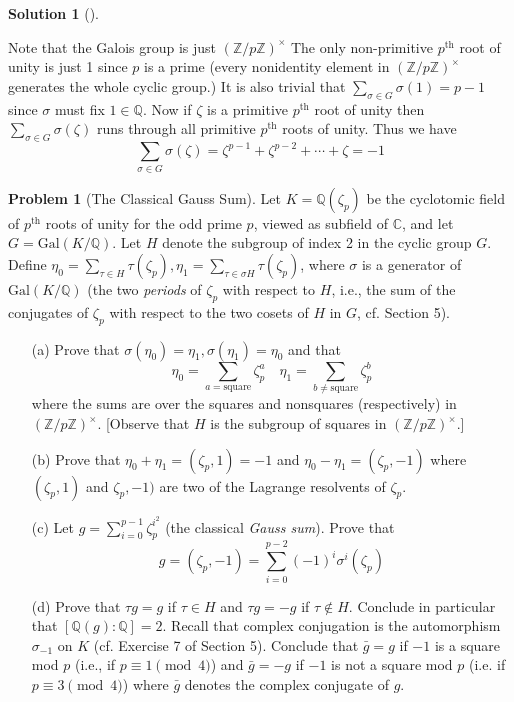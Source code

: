 \documentclass{article}
\theoremstyle{definition}
\newtheorem{prob}{Problem}
\newtheorem*{sol}{Solution}
\newenvironment{sols}[1][]{%
  \begin{sol}[#1]$ $\par\nobreak\ignorespaces
}{%
  \end{sol}
}
\newcommand{\CC}{\mathbb C}
\newcommand{\QQ}{\mathbb Q}
\newcommand{\ZZ}{\mathbb Z}
\newcommand{\Gal}{\text{Gal}}
\begin{document}
\begin{sols}
	Note that the Galois group is just $(\ZZ/p \ZZ)^\times$
	The only non-primitive $p^{\text{th}}$ root of unity is just 1 since $p$ is a prime (every nonidentity element in $(\ZZ/p \ZZ)^\times$ generates the whole cyclic group.)
	It is also trivial that $\sum_{\sigma \in G} \sigma(1) = p - 1$ since $\sigma$ must fix $1 \in \QQ$.
	Now if $\zeta$ is a primitive $p^{\text{th}}$ root of unity then $\sum_{\sigma \in G} \sigma(\zeta)$ runs through all primitive $p^{\text{th}}$ roots of unity.
	Thus we have
	\[
		\sum_{\sigma \in G} \sigma(\zeta) = \zeta^{p - 1} + \zeta^{p - 2} + \cdots + \zeta = -1
	\]
\end{sols}

\setcounter{prob}{10}
\begin{prob}[The Classical Gauss Sum]
	Let $K = \QQ(\zeta_p)$ be the cyclotomic field of $p^{\text{th}}$ roots of unity for the odd prime $p$, viewed as subfield of $\CC$, and let $G = \Gal(K/\QQ)$.
	Let $H$ denote the subgroup of index 2 in the cyclic group $G$.
	Define $\eta_0 = \sum_{\tau \in H} \tau(\zeta_p), \eta_1 = \sum_{\tau \in \sigma H} \tau(\zeta_p)$, where $\sigma$ is a generator of $\Gal(K/\QQ)$ (the two \textit{periods} of $\zeta_p$ with respect to $H$, i.e., the sum of the conjugates of $\zeta_p$ with respect to the two cosets of $H$ in $G$, cf. Section 5).

	\begin{enumerate}
		\item[(a)] Prove that $\sigma(\eta_0) = \eta_1, \sigma(\eta_1) = \eta_0$ and that 
			\[
				\eta_0 = \sum_{a = \text{square}} \zeta_p^a \quad \eta_1 = \sum_{b \neq \text{square}} \zeta_p^b
			\]
			where the sums are over the squares and nonsquares (respectively) in $(\ZZ/p \ZZ)^\times$.
			[Observe that $H$ is the subgroup of squares in $(\ZZ/p \ZZ)^\times$.]

		\item[(b)] Prove that $\eta_0 + \eta_1 = (\zeta_p, 1) = -1$ and $\eta_0 - \eta_1 = (\zeta_p, -1)$ where $(\zeta_p, 1)$ and $\zeta_p, -1)$ are two of the Lagrange resolvents of $\zeta_p$.

		\item[(c)] Let $g = \sum_{i = 0}^{p - 1} \zeta_p^{i^2}$ (the classical \textit{Gauss sum}).
			Prove that
			\[
				g = (\zeta_p, -1) = \sum_{i = 0}^{p - 2} (-1)^i \sigma^i (\zeta_p)
			\]

		\item[(d)] Prove that $\tau g = g$ if $\tau \in H$ and $\tau g = -g$ if $\tau \notin H$.
			Conclude in particular that $[\QQ(g):\QQ] = 2$.
			Recall that complex conjugation is the automorphism $\sigma_{-1}$ on $K$ (cf. Exercise 7 of Section 5).
			Conclude that $\bar{g} = g$ if $-1$ is a square mod $p$ (i.e., if $p \equiv 1 \pmod{4}$) and $\bar{g} = -g$ if $-1$ is not a square mod $p$ (i.e. if $p \equiv 3 \pmod{4}$) where $\bar{g}$ denotes the complex conjugate of $g$.


\end{enumerate}
\end{prob}
\end{document}
